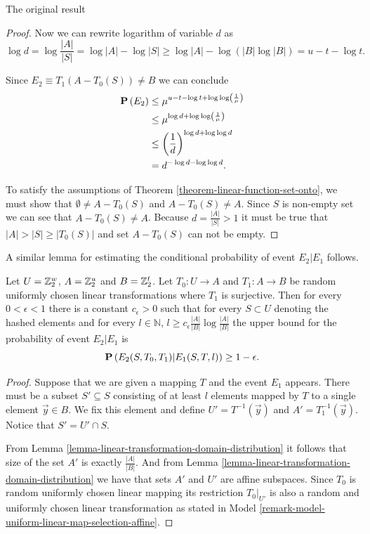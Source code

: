 \begin{section}{The original result}
\begin{proof}
Now we can rewrite logarithm of variable $d$ as 
\[
	\log d = \log \frac{|A|}{|S|} = \log |A| - \log |S| \geq \log |A| - \log (|B| \log |B|) = u - t - \log t \text{.}
\]

Since $E_2 \equiv T_1(A - T_0(S)) \neq B$ we can conclude
\[
\begin{split}
\mathbf{P}\left(E_2\right)
	& \leq \mu^{u - t - \log t + \log \log \left(\frac{1}{\mu}\right)} \\
	& \leq \mu ^ {\log d + \log \log \left(\frac{1}{\mu}\right)} \\
	& \leq \left(\frac{1}{d}\right) ^ {\log d + \log \log d} \\
	& = d ^ {-\log d - \log \log d} \text{.} \\
\end{split}
\]

To satisfy the assumptions of Theorem \ref{theorem-linear-function-set-onto}, we must show that $\emptyset \neq A - T_0(S)$ and $A - T_0(S) \neq A$. Since $S$ is non-empty set we can see that $A - T_0(S) \neq A$. Because $d = \frac{|A|}{|S|} > 1$ it must be true that $|A| > |S| \geq |T_0(S)|$ and set $A - T_0(S)$ can not be empty.
\end{proof}

A similar lemma for estimating the conditional probability of event $E_2 | E_1$ follows.
\begin{remark}
\label{remark-prob-l-length-chain}
Let $U = \mathbb{Z}_{2}^{w}$, $A = \mathbb{Z}_{2}^{u}$ and $B = \mathbb{Z}_{2}^{t}$. Let $T_0: U \rightarrow A$ and $T_1: A \rightarrow B$ be random uniformly chosen linear transformations where $T_1$ is surjective. Then for every $0 < \epsilon < 1$ there is a constant $c_{\epsilon} > 0$ such that for every $S \subset U$ denoting the hashed  elements and for every $l \in \mathbb{N}$, $l \geq c_{\epsilon}{\frac{|A|}{|B|}}\log\frac{|A|}{|B|}$ the upper bound for the probability of event $E_2 | E_1$ is
\[
	\mathbf{P}\left(E_2(S, T_0, T_1) | E_1(S, T, l)\right) \geq 1 - \epsilon \text{.}
\]
\end{remark}
\begin{proof}
Suppose that we are given a mapping $T$ and the event $E_1$ appears. There must be a subset $S' \subseteq S$ consisting of at least $l$ elements mapped by $T$ to a single element $\vec{y} \in B$. We fix this element and define $U' = T^{-1}(\vec{y})$ and $A' = T_1^{-1}(\vec{y})$. Notice that $S' = U' \cap S$.

From Lemma \ref{lemma-linear-transformation-domain-distribution} it follows that size of the set $A'$ is exactly $\frac{|A|}{|B|}$. And from Lemma \ref{lemma-linear-transformation-domain-distribution} we have that sets $A'$ and $U'$ are affine subspaces. Since $T_0$ is random uniformly chosen linear mapping its restriction $T_0|_{U'}$ is also a random and uniformly chosen linear transformation as stated in Model \ref{remark-model-uniform-linear-map-selection-affine}.


\end{proof}
\end{section}
